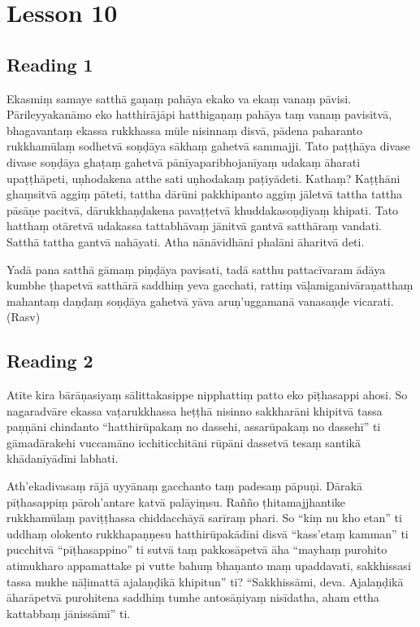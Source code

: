 \chapter{Lesson 10}

\section*{Reading 1}

Ekasmiṃ samaye satthā gaṇaṃ pahāya ekako va ekaṃ vanaṃ pāvisi. Pārileyyakanāmo eko hatthirājāpi hatthigaṇaṃ pahāya taṃ vanaṃ pavisitvā, bhagavantaṃ ekassa rukkhassa mūle nisinnaṃ disvā, pādena paharanto rukkhamūlaṃ sodhetvā soṇḍāya sākhaṃ gahetvā sammajji. Tato paṭṭhāya divase divase soṇḍāya ghaṭaṃ gahetvā pānīyaparibhojanīyaṃ udakaṃ āharati upaṭṭhāpeti, uṇhodakena atthe sati uṇhodakaṃ paṭiyādeti. Kathaṃ? Kaṭṭhāni ghaṃsitvā aggiṃ pāteti, tattha dārūni pakkhipanto aggiṃ jāletvā tattha tattha pāsāṇe pacitvā, dārukkhaṇḍakena pavaṭṭetvā khuddakasoṇḍiyaṃ khipati. Tato hatthaṃ otāretvā udakassa tattabhāvaṃ jānitvā gantvā satthāraṃ vandati. Satthā tattha gantvā nahāyati. Atha nānāvidhāni phalāni āharitvā deti.

Yadā pana satthā gāmaṃ piṇḍāya pavisati, tadā satthu pattacīvaram ādāya kumbhe ṭhapetvā satthārā saddhiṃ yeva gacchati, rattiṃ vāḷamiganivāraṇatthaṃ mahantaṃ daṇḍaṃ soṇḍāya gahetvā yāva aruṇ’uggamanā vanasaṇḍe vicarati. (Rasv)

\section*{Reading 2}

Atīte kira bārāṇasiyaṃ sālittakasippe nipphattiṃ patto eko pīṭhasappi ahosi. So nagaradvāre ekassa vaṭarukkhassa heṭṭhā nisinno sakkharāni khipitvā tassa paṇṇāni chindanto “hatthirūpakaṃ no dassehi, assarūpakaṃ no dassehī” ti gāmadārakehi vuccamāno icchiticchitāni rūpāni dassetvā tesaṃ santikā khādanīyādīni labhati.

Ath’ekadivasaṃ rājā uyyānaṃ gacchanto taṃ padesaṃ pāpuṇi. Dārakā pīṭhasappiṃ pāroh’antare katvā palāyiṃsu. Rañño ṭhitamajjhantike rukkhamūlaṃ paviṭṭhassa chiddacchāyā sarīraṃ phari. So “kiṃ nu kho etan” ti uddhaṃ olokento rukkhapaṇṇesu hatthirūpakādīni disvā “kass’etaṃ kamman” ti pucchitvā “pīṭhasappino” ti sutvā taṃ pakkosāpetvā āha “mayhaṃ purohito atimukharo appamattake pi vutte bahuṃ bhaṇanto maṃ upaddavati, sakkhissasi tassa mukhe nāḷimattā ajalaṇḍikā khipitun” ti? “Sakkhissāmi, deva. Ajalaṇḍikā āharāpetvā purohitena saddhiṃ tumhe antosāṇiyaṃ nisīdatha, aham ettha kattabbaṃ jānissāmī” ti.


